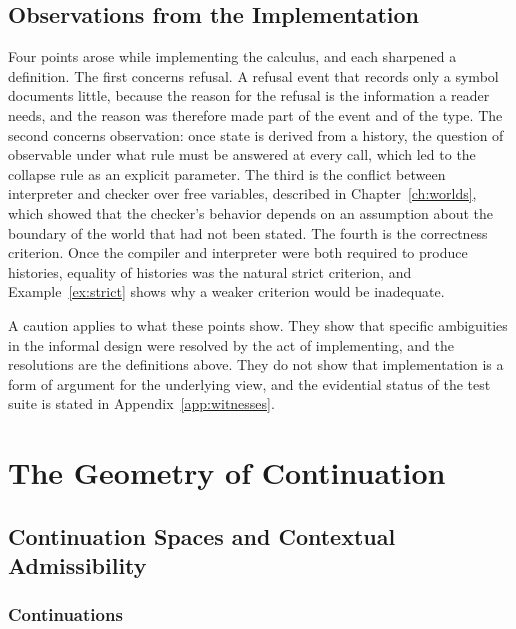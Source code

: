 \documentclass[12pt,oneside,openany]{book}
\theoremstyle{spherepop}
\theoremstyle{remarkstyle}
\begin{document}
\chapter{Observations from the Implementation}
\label{ch:lessons}

Four points arose while implementing the calculus, and each sharpened a definition. The first concerns refusal. A refusal event that records only a symbol documents little, because the reason for the refusal is the information a reader needs, and the reason was therefore made part of the event and of the type. The second concerns observation: once state is derived from a history, the question of observable under what rule must be answered at every call, which led to the collapse rule as an explicit parameter. The third is the conflict between interpreter and checker over free variables, described in Chapter~\ref{ch:worlds}, which showed that the checker's behavior depends on an assumption about the boundary of the world that had not been stated. The fourth is the correctness criterion. Once the compiler and interpreter were both required to produce histories, equality of histories was the natural strict criterion, and Example~\ref{ex:strict} shows why a weaker criterion would be inadequate.

A caution applies to what these points show. They show that specific ambiguities in the informal design were resolved by the act of implementing, and the resolutions are the definitions above. They do not show that implementation is a form of argument for the underlying view, and the evidential status of the test suite is stated in Appendix~\ref{app:witnesses}.

\part{The Geometry of Continuation}
\label{part:cont}

\chapter{Continuation Spaces and Contextual Admissibility}
\label{ch:cont}

\section{Continuations}
\end{document}
